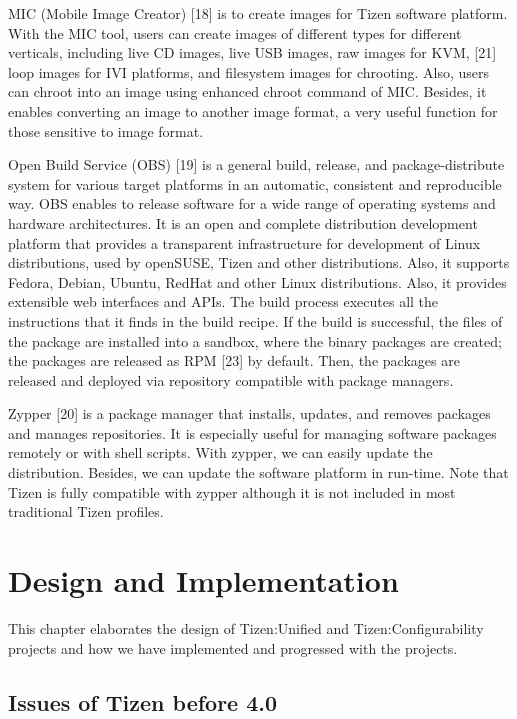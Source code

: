 MIC (Mobile Image Creator) [18] is to create images for Tizen software platform.  With the MIC tool, users can create images of different types for different verticals, including live CD images, live USB images, raw images for KVM, [21] loop images for IVI platforms, and filesystem images for chrooting.  Also, users can chroot into an image using enhanced chroot command of MIC. Besides, it enables converting an image to another image format, a very useful function for those sensitive to image format. 


Open Build Service (OBS) [19] is a general build, release, and package-distribute system for various target platforms in an automatic, consistent and reproducible way. OBS enables to release software for a wide range of operating systems and hardware architectures. It is an open and complete distribution development platform that provides a transparent infrastructure for development of Linux distributions, used by openSUSE, Tizen and other distributions. Also, it supports Fedora, Debian, Ubuntu, RedHat and other Linux distributions. Also, it provides extensible web interfaces and APIs. The build process executes all the instructions that it finds in the build recipe. If the build is successful, the files of the package are installed into a sandbox, where the binary packages are created; the packages are released as RPM [23] by default. Then, the packages are released and deployed via repository compatible with package managers.


Zypper [20] is a package manager that installs, updates, and removes packages and manages repositories. It is especially useful for managing software packages remotely or with shell scripts. With zypper, we can easily update the distribution. Besides, we can update the software platform in run-time. Note that Tizen is fully compatible with zypper although it is not included in most traditional Tizen profiles.


\section{Design and Implementation}

This chapter elaborates the design of Tizen:Unified and Tizen:Configurability projects and how we have implemented and progressed with the projects.

\subsection{Issues of Tizen before 4.0}

